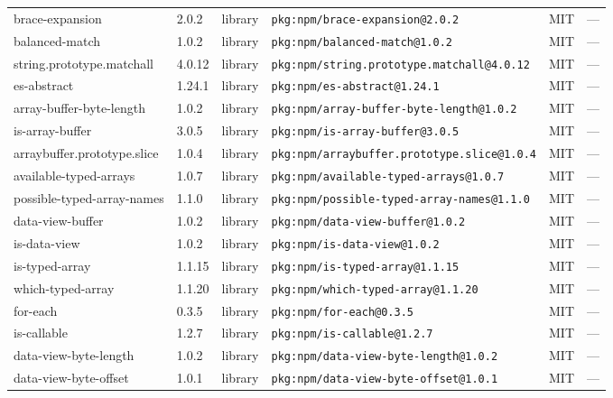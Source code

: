 \documentclass[11pt,a4paper]{article}
\begin{document}
\begin{longtable}{|p{4cm}|p{2cm}|p{1.6cm}|p{5cm}|p{1.5cm}|p{3.5cm}|}
\raggedright brace-expansion & 2.0.2 & library & \small\texttt{pkg:npm/brace-expansion@2.0.2} & MIT & \small — \\
\raggedright balanced-match & 1.0.2 & library & \small\texttt{pkg:npm/balanced-match@1.0.2} & MIT & \small — \\
\raggedright string.prototype.matchall & 4.0.12 & library & \small\texttt{pkg:npm/string.prototype.matchall@4.0.12} & MIT & \small — \\
\raggedright es-abstract & 1.24.1 & library & \small\texttt{pkg:npm/es-abstract@1.24.1} & MIT & \small — \\
\raggedright array-buffer-byte-length & 1.0.2 & library & \small\texttt{pkg:npm/array-buffer-byte-length@1.0.2} & MIT & \small — \\
\raggedright is-array-buffer & 3.0.5 & library & \small\texttt{pkg:npm/is-array-buffer@3.0.5} & MIT & \small — \\
\raggedright arraybuffer.prototype.slice & 1.0.4 & library & \small\texttt{pkg:npm/arraybuffer.prototype.slice@1.0.4} & MIT & \small — \\
\raggedright available-typed-arrays & 1.0.7 & library & \small\texttt{pkg:npm/available-typed-arrays@1.0.7} & MIT & \small — \\
\raggedright possible-typed-array-names & 1.1.0 & library & \small\texttt{pkg:npm/possible-typed-array-names@1.1.0} & MIT & \small — \\
\raggedright data-view-buffer & 1.0.2 & library & \small\texttt{pkg:npm/data-view-buffer@1.0.2} & MIT & \small — \\
\raggedright is-data-view & 1.0.2 & library & \small\texttt{pkg:npm/is-data-view@1.0.2} & MIT & \small — \\
\raggedright is-typed-array & 1.1.15 & library & \small\texttt{pkg:npm/is-typed-array@1.1.15} & MIT & \small — \\
\raggedright which-typed-array & 1.1.20 & library & \small\texttt{pkg:npm/which-typed-array@1.1.20} & MIT & \small — \\
\raggedright for-each & 0.3.5 & library & \small\texttt{pkg:npm/for-each@0.3.5} & MIT & \small — \\
\raggedright is-callable & 1.2.7 & library & \small\texttt{pkg:npm/is-callable@1.2.7} & MIT & \small — \\
\raggedright data-view-byte-length & 1.0.2 & library & \small\texttt{pkg:npm/data-view-byte-length@1.0.2} & MIT & \small — \\
\raggedright data-view-byte-offset & 1.0.1 & library & \small\texttt{pkg:npm/data-view-byte-offset@1.0.1} & MIT & \small — \\

\end{longtable}
\end{document}
